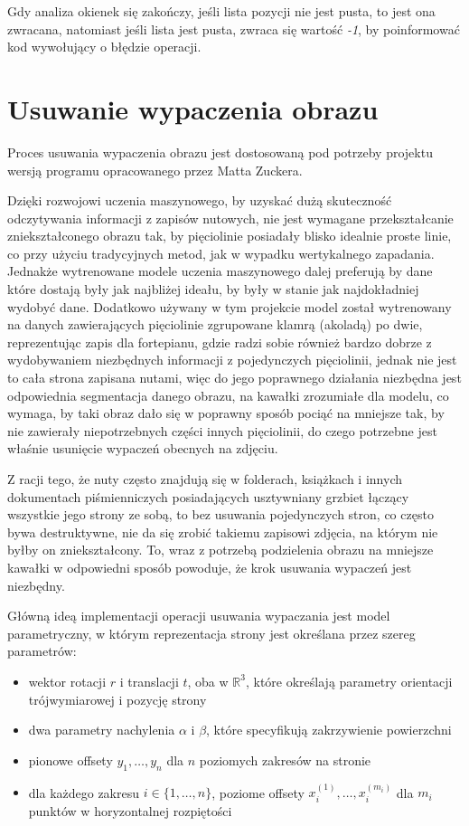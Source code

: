 Gdy analiza okienek się zakończy, jeśli lista pozycji nie jest pusta, to jest ona zwracana, natomiast jeśli lista jest pusta, zwraca się wartość \textit{-1}, by poinformować kod wywołujący o błędzie operacji.

\section{Usuwanie wypaczenia obrazu}

Proces usuwania wypaczenia obrazu jest dostosowaną pod potrzeby projektu wersją programu opracowanego przez Matta Zuckera.

Dzięki rozwojowi uczenia maszynowego, by uzyskać dużą skuteczność odczytywania informacji z zapisów nutowych, nie jest wymagane przekształcanie zniekształconego obrazu tak, by pięciolinie posiadały blisko idealnie proste linie, co przy użyciu tradycyjnych metod, jak w wypadku wertykalnego zapadania. Jednakże wytrenowane modele uczenia maszynowego dalej preferują by dane które dostają były jak najbliżej ideału, by były w stanie jak najdokładniej wydobyć dane. Dodatkowo używany w tym projekcie model został wytrenowany na danych zawierających pięciolinie zgrupowane klamrą (akoladą) po dwie, reprezentując zapis dla fortepianu, gdzie radzi sobie również bardzo dobrze z wydobywaniem niezbędnych informacji z pojedynczych pięciolinii, jednak nie jest to cała strona zapisana nutami, więc do jego poprawnego działania niezbędna jest odpowiednia segmentacja danego obrazu, na kawałki zrozumiałe dla modelu, co wymaga, by taki obraz dało się w poprawny sposób pociąć na mniejsze tak, by nie zawierały niepotrzebnych części innych pięciolinii, do czego potrzebne jest właśnie usunięcie wypaczeń obecnych na zdjęciu.

Z racji tego, że nuty często znajdują się w folderach, książkach i innych dokumentach piśmienniczych posiadających usztywniany grzbiet łączący wszystkie jego strony ze sobą, to bez usuwania pojedynczych stron, co często bywa destruktywne, nie da się zrobić takiemu zapisowi zdjęcia, na którym nie byłby on zniekształcony. To, wraz z potrzebą podzielenia obrazu na mniejsze kawałki w odpowiedni sposób powoduje, że krok usuwania wypaczeń jest niezbędny.

Główną ideą implementacji operacji usuwania wypaczania jest model parametryczny, w którym reprezentacja strony jest określana przez szereg parametrów:

\begin{itemize}
	\item wektor rotacji $r$ i translacji $t$, oba w $\mathbb{R}^{3}$, które określają parametry orientacji trójwymiarowej i pozycję strony
	\item dwa parametry nachylenia $\alpha$ i $\beta$, które specyfikują zakrzywienie powierzchni
	\item pionowe offsety $y_{1},\ldots,y_{n}$ dla $n$ poziomych zakresów na stronie
	\item dla każdego zakresu $i \in \{1,\ldots,n\}$, poziome offsety $x_{i}^{(1)},\ldots,x_{i}^{(m_{i})}$ dla $m_{i}$ punktów w horyzontalnej rozpiętości
\end{itemize} 

